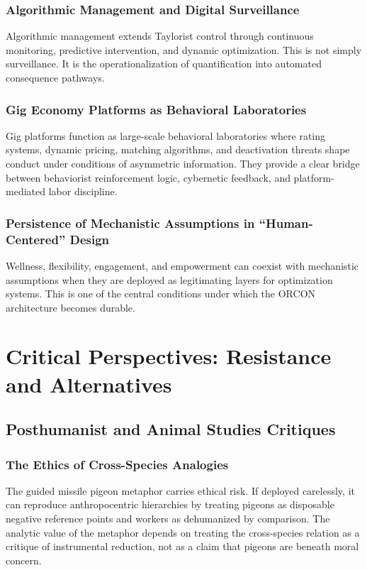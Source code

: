 \documentclass[11pt, a4paper]{article}
\begin{document}
\subsubsection{Algorithmic Management and Digital Surveillance}
Algorithmic management extends Taylorist control through continuous monitoring, predictive intervention, and dynamic optimization. This is not simply surveillance. It is the operationalization of quantification into automated consequence pathways.

\subsubsection{Gig Economy Platforms as Behavioral Laboratories}
Gig platforms function as large-scale behavioral laboratories where rating systems, dynamic pricing, matching algorithms, and deactivation threats shape conduct under conditions of asymmetric information. They provide a clear bridge between behaviorist reinforcement logic, cybernetic feedback, and platform-mediated labor discipline.

\subsubsection{Persistence of Mechanistic Assumptions in ``Human-Centered'' Design}
Wellness, flexibility, engagement, and empowerment can coexist with mechanistic assumptions when they are deployed as legitimating layers for optimization systems. This is one of the central conditions under which the ORCON architecture becomes durable.

\section{Critical Perspectives: Resistance and Alternatives}

\subsection{Posthumanist and Animal Studies Critiques}

\subsubsection{The Ethics of Cross-Species Analogies}
The guided missile pigeon metaphor carries ethical risk. If deployed carelessly, it can reproduce anthropocentric hierarchies by treating pigeons as disposable negative reference points and workers as dehumanized by comparison. The analytic value of the metaphor depends on treating the cross-species relation as a critique of instrumental reduction, not as a claim that pigeons are beneath moral concern.
\end{document}

